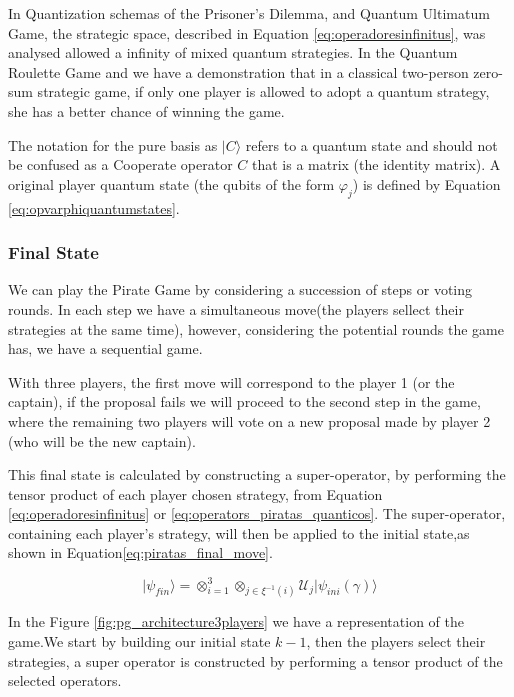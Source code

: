 In Quantization schemas of the Prisoner's Dilemma\cite{Letters2002}\cite{Eisert2008}, and Quantum Ultimatum Game\cite{Fra2011}, the strategic space, described in Equation \ref{eq:operadoresinfinitus}, was analysed allowed a infinity of mixed quantum strategies. In the Quantum Roulette Game\cite{Salimi2009} and \cite{Meyer1999} we have a demonstration that in a classical two-person zero-sum strategic game, if only one player is allowed to adopt a quantum strategy, she has a better chance of winning the game. 

The notation for the pure basis as $\vert C\rangle$ refers to a quantum state and should not be confused as a Cooperate operator $C$ that is a matrix (the identity matrix). A original player quantum state (the qubits of the form $\varphi_{j}$) is defined by Equation \ref{eq:opvarphiquantumstates}.





\subsubsection{Final State}
\label{subsec:pirates_finalstate}

We can play the Pirate Game by considering a succession of steps or voting rounds. In each step we have a simultaneous move(the players sellect their strategies at the same time), however, considering the potential rounds the game has, we have a sequential game. 

With three players, the first move will correspond to the player 1 (or the captain), if the proposal fails we will proceed to the second step in the game, where the remaining two players will vote on a new proposal made by player 2 (who will be the new captain). 

This final state is calculated by constructing a super-operator, by performing the tensor product of each player chosen strategy, from Equation \ref{eq:operadoresinfinitus} or \ref{eq:operators_piratas_quanticos}. The super-operator, containing each player's strategy, will then be applied to the initial state,as shown in Equation\ref{eq:piratas_final_move}.

\begin{equation}
\vert\psi_{fin}\rangle=\otimes_{i=1}^{3}\otimes_{j\in\xi^{-1}(i)}\mathcal{U}_{j}\vert\psi_{ini}(\gamma)\rangle
\label{eq:piratas_final_move}
\end{equation}

In the Figure \ref{fig:pg_architecture3players} we have a representation of the game.We start by building our initial state $k-1$, then the players  select their strategies, a super operator is constructed by performing a tensor product of the selected operators. 

